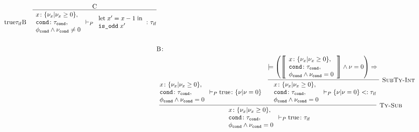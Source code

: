 \begin{align*}
{{        {\true}
        {\tau_\mathrm{if}}
    } { \mathrm{B} }
    \quad
    \infer {
      \TyJudge{P}
        {\begin{array}{l}
          \typed{x}{\TyInt{\nu_x}{\nu_x \geq 0}}, \\
          \typed{\code{cond}}{\tau_\code{cond}}, \\
          \phi_\code{cond} \land \nu_\code{cond} \neq 0
        \end{array}}
        {\begin{array}{l}
          \Let{\; x'}{x-1 \;}{\\
          \App{\code{is\_odd}}{x' \;}}
        \end{array}}
        {\tau_\mathrm{if}}
    } { \mathrm{C} }
  } \\\\
  & \mathrm{B} \colon \\
  & \infer[\TyRuleSub] {
    \TyJudge{P}
      {\begin{array}{l}
        \typed{x}{\TyInt{\nu_x}{\nu_x \geq 0}}, \\
        \typed{\code{cond}}{\tau_\code{cond}}, \\
        \phi_\code{cond} \land \nu_\code{cond} = 0
      \end{array}}
      {\true}
      {\tau_\mathrm{if}}
  } {
    \TyJudge{P}
      {\begin{array}{l}
        \typed{x}{\TyInt{\nu_x}{\nu_x \geq 0}}, \\
        \typed{\code{cond}}{\tau_\code{cond}}, \\
        \phi_\code{cond} \land \nu_\code{cond} = 0
      \end{array}}
      {\true}
      {\TyInt{\nu}{\nu = 0}}
    \quad
    \infer[\SubTyRuleInt] {
      \SubTyJudge{P}
        {\begin{array}{l}
          \typed{x}{\TyInt{\nu_x}{\nu_x \geq 0}}, \\
          \typed{\code{cond}}{\tau_\code{cond}}, \\
          \phi_\code{cond} \land \nu_\code{cond} = 0
        \end{array}}
        {\TyInt{\nu}{\nu = 0}}
        {\tau_\mathrm{if}}
    } {
      \models \left\paren{\left\sem{\begin{array}{l}
          \typed{x}{\TyInt{\nu_x}{\nu_x \geq 0}}, \\
          \typed{\code{cond}}{\tau_\code{cond}}, \\
          \phi_\code{cond} \land \nu_\code{cond} = 0
      \end{array}\right} \land \nu = 0\right} \Rightarrow \begin{array}{l}

\end{array}}}
\end{align*}
